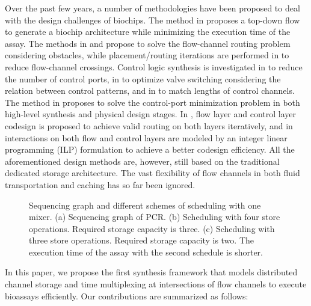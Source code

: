 
Over the past few years, a number of methodologies have been proposed to deal with the design challenges of biochips. The method in \cite{MinhassPMB12} proposes a top-down flow to generate a biochip architecture while minimizing the execution time of the assay. The methods in \cite{LinLCLH14} and \cite{huang2019timing} propose to solve the flow-channel routing problem considering obstacles, while placement/routing iterations are performed in \cite{WangRYHC16} to reduce flow-channel crossings. Control logic synthesis is investigated in \cite{MinhassPMH13} to reduce the number of control ports, in \cite{WangZYHLSC17} to optimize valve switching considering the relation between control patterns, and in \cite{YaoHC15} to match lengths of control channels. The method in \cite{Huang2019DAC} proposes to solve the control-port minimization problem in both high-level synthesis and physical design stages.  In \cite{YaoWRCH15}, flow layer and control layer codesign is proposed to achieve valid routing on both layers iteratively, and in \cite{TsengLLHS16} interactions on both flow and control layers are modeled by an integer linear programming (ILP) formulation to achieve a better codesign efficiency. All the aforementioned design methods are, however, still based on the traditional dedicated storage architecture. The vast flexibility of flow channels in both fluid transportation and caching has so far been ignored.

\begin{figure}[t]
{\figurefontsize
\centering

\caption{Sequencing graph and different schemes of scheduling with
one mixer.
(a) Sequencing
graph of PCR. (b) Scheduling with four store operations.
Required storage capacity is three.
(c) Scheduling with three store operations. Required storage capacity is two.
The execution time of the assay with the second schedule is shorter.}
\label{fig:pcr}
}
\end{figure}
In this paper, we propose the first synthesis framework that models distributed channel storage and time multiplexing at intersections of flow channels to execute bioassays efficiently. Our contributions are summarized as follows:

